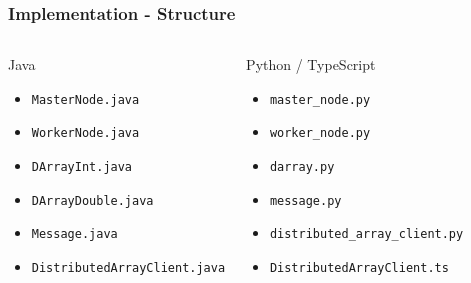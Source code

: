 \documentclass{beamer}
\begin{document}
\begin{frame}
\frametitle{Implementation - Structure}
\begin{columns}
\begin{block}{Java}
    \begin{itemize}
        \item<1-> \texttt{MasterNode.java}
        \item<2-> \texttt{WorkerNode.java}
        \item<3-> \texttt{DArrayInt.java}
        \item<3-> \texttt{DArrayDouble.java}
        \item<4-> \texttt{Message.java}
        \item<5-> \texttt{DistributedArrayClient.java}
    \end{itemize}
\end{block}

\begin{block}{Python / TypeScript}
    \begin{itemize}
        \item<1-> \texttt{master\_node.py}
        \item<2-> \texttt{worker\_node.py}
        \item<3-> \texttt{darray.py}
        \item<4-> \texttt{message.py}
        \item<5-> \texttt{distributed\_array\_client.py}
        \item<6-> \texttt{DistributedArrayClient.ts}
    \end{itemize}
\end{block}
\end{columns}
\end{frame}
\end{document}
